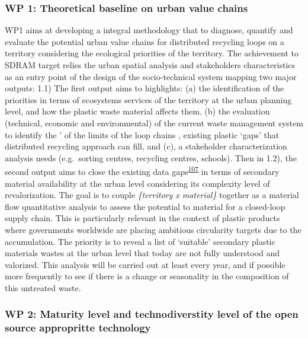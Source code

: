 \documentclass[
  11pt,
  a4paperpaper,
  onecolumn]{article}
\begin{document}
\hypertarget{wp-1-theoretical-baseline-on-urban-value-chains}{%
\subsubsection{WP 1: Theoretical baseline on urban value
chains}\label{wp-1-theoretical-baseline-on-urban-value-chains}}

WP1 aims at developing a integral methodology that to diagnose, quantify
and evaluate the potential urban value chains for distributed recycling
loops on a territory considering the ecological priorities of the
territory. The achievement to SDRAM target relies the urban spatial
analysis and stakeholders characteristics as an entry point of the
design of the socio-technical system mapping two major outputs: 1.1) The
first output aims to highlights: (a) the identification of the
priorities in terms of ecosystems services of the territory at the urban
planning level, and how the plastic waste material affects them. (b) the
evaluation (technical, economic and environmental) of the current waste
management system to identify the ' of the limits of the loop chains ,
existing plastic `gaps' that distributed recycling approach can fill,
and (c), a stakeholder characterization analysis needs (e.g.~sorting
centres, recycling centres, schools). Then in 1.2), the second output
aims to close the existing data
gaps\textsuperscript{\protect\hyperlink{ref-Bianchi2020}{107}} in terms
of secondary material availability at the urban level considering its
complexity level of revalorization. The goal is to couple
\emph{\{territory x material\}} together as a material flow quantitative
analysis to assess the potential to material for a closed-loop supply
chain. This is particularly relevant in the context of plastic products
where governments worldwide are placing ambitious circularity targets
due to the accumulation. The priority is to reveal a list of `suitable'
secondary plastic materials wastes at the urban level that today are not
fully understood and valorized. This analysis will be carried out at
least every year, and if possible more frequently to see if there is a
change or seasonality in the composition of this untreated waste.

\hypertarget{wp-2-maturity-level-and-technodiverstity-level-of-the-open-source-appropritte-technology}{%
\subsubsection{WP 2: Maturity level and technodiverstity level of the
open source appropritte
technology}\label{wp-2-maturity-level-and-technodiverstity-level-of-the-open-source-appropritte-technology}}
\end{document}
